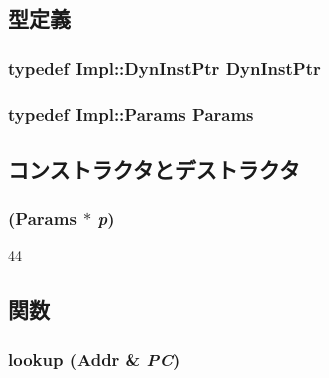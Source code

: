 \subsection{型定義}
\hypertarget{classNullPredictor_a028ce10889c5f6450239d9e9a7347976}{
\subsubsection[{DynInstPtr}]{\setlength{\rightskip}{0pt plus 5cm}typedef Impl::DynInstPtr {\bf DynInstPtr}}}
\label{classNullPredictor_a028ce10889c5f6450239d9e9a7347976}
\hypertarget{classNullPredictor_a818e103eae798a24a06a0a34631849ea}{
\subsubsection[{Params}]{\setlength{\rightskip}{0pt plus 5cm}typedef Impl::Params {\bf Params}}}
\label{classNullPredictor_a818e103eae798a24a06a0a34631849ea}


\subsection{コンストラクタとデストラクタ}
\hypertarget{classNullPredictor_af4fda7171866446e9126f9e3f4f38890}{
\subsubsection[{NullPredictor}]{ ({\bf Params} $\ast$ {\em p})}}
\label{classNullPredictor_af4fda7171866446e9126f9e3f4f38890}



\begin{DoxyCode}
44 { }
\end{DoxyCode}


\subsection{関数}
\hypertarget{classNullPredictor_ade293a98582b6cd35fbcea295860b657}{
\subsubsection[{lookup}]{ lookup ({\bf Addr} \& {\em PC})}}
\label{classNullPredictor_ade293a98582b6cd35fbcea295860b657}



